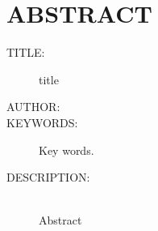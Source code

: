 
\chapter*{ABSTRACT}

\footnotesize{
\begin{description}
  \item[TITLE:] title
  \item[AUTHOR:] \MakeUppercase{\autor} 
  \item[KEYWORDS:] Key words.
  \item[DESCRIPTION:]\hfill \\ Abstract
\end{description}}\normalsize
